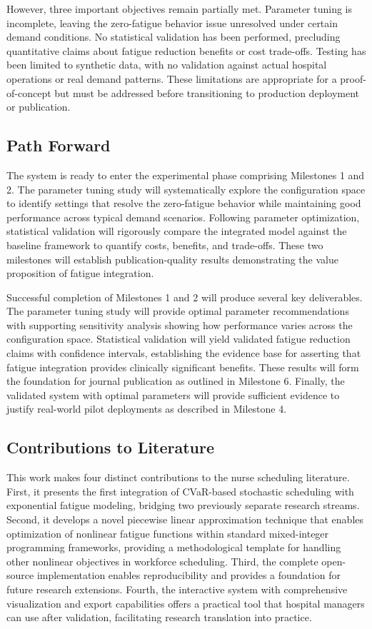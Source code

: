 \documentclass[11pt,letterpaper]{article}
\begin{document}
However, three important objectives remain partially met. Parameter tuning is incomplete, leaving the zero-fatigue behavior issue unresolved under certain demand conditions. No statistical validation has been performed, precluding quantitative claims about fatigue reduction benefits or cost trade-offs. Testing has been limited to synthetic data, with no validation against actual hospital operations or real demand patterns. These limitations are appropriate for a proof-of-concept but must be addressed before transitioning to production deployment or publication.

\subsection{Path Forward}
The system is ready to enter the experimental phase comprising Milestones 1 and 2. The parameter tuning study will systematically explore the configuration space to identify settings that resolve the zero-fatigue behavior while maintaining good performance across typical demand scenarios. Following parameter optimization, statistical validation will rigorously compare the integrated model against the baseline framework to quantify costs, benefits, and trade-offs. These two milestones will establish publication-quality results demonstrating the value proposition of fatigue integration.

Successful completion of Milestones 1 and 2 will produce several key deliverables. The parameter tuning study will provide optimal parameter recommendations with supporting sensitivity analysis showing how performance varies across the configuration space. Statistical validation will yield validated fatigue reduction claims with confidence intervals, establishing the evidence base for asserting that fatigue integration provides clinically significant benefits. These results will form the foundation for journal publication as outlined in Milestone 6. Finally, the validated system with optimal parameters will provide sufficient evidence to justify real-world pilot deployments as described in Milestone 4.

\subsection{Contributions to Literature}
This work makes four distinct contributions to the nurse scheduling literature. First, it presents the first integration of CVaR-based stochastic scheduling with exponential fatigue modeling, bridging two previously separate research streams. Second, it develops a novel piecewise linear approximation technique that enables optimization of nonlinear fatigue functions within standard mixed-integer programming frameworks, providing a methodological template for handling other nonlinear objectives in workforce scheduling. Third, the complete open-source implementation enables reproducibility and provides a foundation for future research extensions. Fourth, the interactive system with comprehensive visualization and export capabilities offers a practical tool that hospital managers can use after validation, facilitating research translation into practice.
\end{document}
